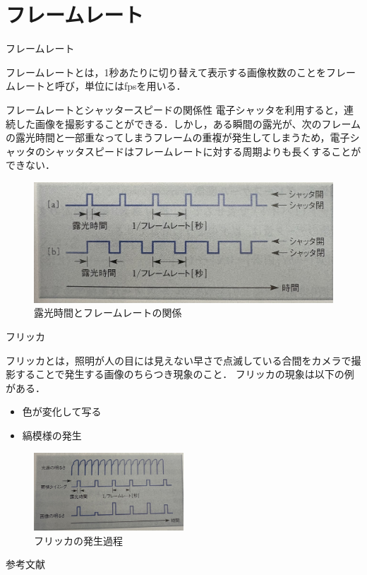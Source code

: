 \documentclass[8pt, jfont=ipaexm, t]{beamer} %
\begin{document}
\section{フレームレート}
\begin{frame}{フレームレート}
\begin{block}{}
  フレームレートとは，1秒あたりに切り替えて表示する画像枚数のことをフレームレートと呼び，単位にはfpsを用いる．
\end{block}
\begin{block}{フレームレートとシャッタースピードの関係性}
  電子シャッタを利用すると，連続した画像を撮影することができる．しかし，ある瞬間の露光が、次のフレームの露光時間と一部重なってしまうフレームの重複が発生してしまうため，電子シャッタのシャッタスピードはフレームレートに対する周期よりも長くすることができない．
\end{block}

\begin{figure}[H]
  \centering
  \includegraphics[width=0.5 \textwidth]{figure/011.jpg}
  \caption{露光時間とフレームレートの関係}
\end{figure}
\end{frame}

\begin{frame}{フリッカ}
  \begin{block}{}
    フリッカとは，照明が人の目には見えない早さで点滅している合間をカメラで撮影することで発生する画像のちらつき現象のこと．
    フリッカの現象は以下の例がある．
    \begin{itemize}
      \item 色が変化して写る
      \item 縞模様の発生
    \end{itemize}
  \end{block}
  \begin{figure}[H]
      \centering
      \includegraphics[width=0.5\textwidth]{figure/012.jpg}
      \caption{フリッカの発生過程}
      \label{fig:label}
  \end{figure}
\end{frame}




\begin{frame}[allowframebreaks]{参考文献}
  \beamertemplatetextbibitems
	
  \nocite{*}
	
\end{frame}
\end{document}
